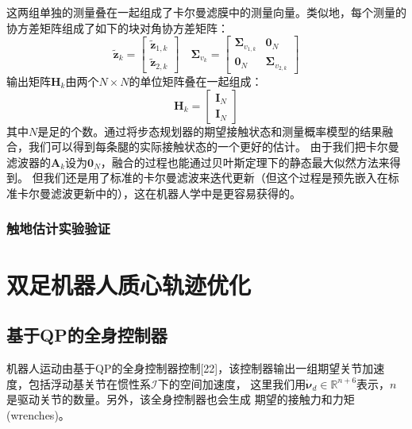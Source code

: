 这两组单独的测量叠在一起组成了卡尔曼滤膜中的测量向量。类似地，每个测量的协方差矩阵组成了如下的块对角协方差矩阵：
\begin{equation}
    \label{equ:est_h_and_f}
    \tilde{\boldsymbol{z}}_k=\left[\begin{array}{c}
        \tilde{\boldsymbol{z}}_{1, k} \\
        \tilde{\boldsymbol{z}}_{2, k}
        \end{array}\right] \quad \boldsymbol{\Sigma}_{v_k}=\left[\begin{array}{cc}
        \boldsymbol{\Sigma}_{v_{1, k}} & \mathbf{0}_N \\
        \mathbf{0}_N & \boldsymbol{\Sigma}_{v_{2, k}}
        \end{array}\right]
\end{equation}
输出矩阵$\boldsymbol{H}_k$由两个$N\times N$的单位矩阵叠在一起组成：
\begin{equation}
    \label{equ:output_matrix}
    \boldsymbol{H}_k=\left[\begin{array}{l}
        \mathbf{I}_N \\
        \mathbf{I}_N
        \end{array}\right]
\end{equation}
其中$N$是足的个数。通过将步态规划器的期望接触状态和测量概率模型的结果融合，我们可以得到每条腿的实际接触状态的一个更好的估计。
由于我们把卡尔曼滤波器的$\boldsymbol{A}_k$设为$\mathbf{0}_N$，融合的过程也能通过贝叶斯定理下的静态最大似然方法来得到。
但我们还是用了标准的卡尔曼滤波来迭代更新（但这个过程是预先嵌入在标准卡尔曼滤波更新中的），这在机器人学中是更容易获得的。

\subsection{触地估计实验验证}


\chapter{双足机器人质心轨迹优化}
\section{基于QP的全身控制器}
机器人运动由基于QP的全身控制器控制[22]，该控制器输出一组期望关节加速度，包括浮动基关节在惯性系$\mathcal{I}$下的空间加速度，
这里我们用$\dot{\boldsymbol{\nu}}_d \in \mathbb{R}^{n+6}$表示，$n$是驱动关节的数量。另外，该全身控制器也会生成
期望的接触力和力矩(wrenches)。

